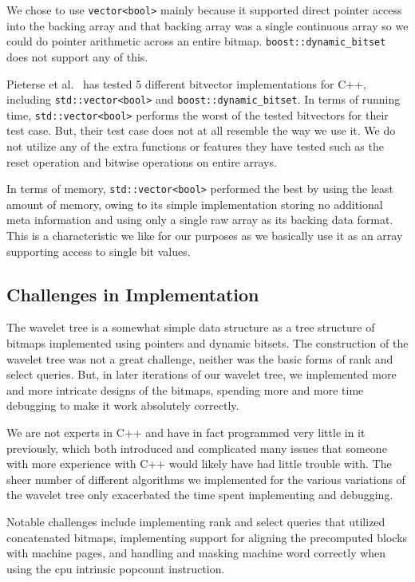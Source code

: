 We chose to use \texttt{vector<bool>} mainly because it supported direct pointer access into the backing array and that backing array was a single continuous array so we could do pointer arithmetic across an entire bitmap.
\texttt{boost::dynamic\_bitset} does not support any of this.

Pieterse et al.~ has tested 5 different bitvector implementations for C++, including \texttt{std::vector<bool>} and \texttt{boost::dynamic\_bitset}.
In terms of running time, \texttt{std::vector<bool>} performs the worst of the tested bitvectors for their test case.
But, their test case does not at all resemble the way we use it.
We do not utilize any of the extra functions or features they have tested such as the reset operation and bitwise operations on entire arrays.

In terms of memory, \texttt{std::vector<bool>} performed the best by using the least amount of memory, owing to its simple implementation storing no additional meta information and using only a single raw array as its backing data format.
This is a characteristic we like for our purposes as we basically use it as an array supporting access to single bit values.

\subsection{Challenges in Implementation}
The wavelet tree is a somewhat simple data structure as a tree structure of bitmaps implemented using pointers and dynamic bitsets.
The construction of the wavelet tree was not a great challenge, neither was the basic forms of rank and select queries.
But, in later iterations of our wavelet tree, we implemented more and more intricate designs of the bitmaps, spending more and more time debugging to make it work absolutely correctly.

We are not experts in C++ and have in fact programmed very little in it previously, which both introduced and complicated many issues that someone with more experience with C++ would likely have had little trouble with.
The sheer number of different algorithms we implemented for the various variations of the wavelet tree only exacerbated the time spent implementing and debugging.

Notable challenges include implementing rank and select queries that utilized concatenated bitmaps, implementing support for aligning the precomputed blocks with machine pages, and handling and masking machine word correctly when using the cpu intrinsic popcount instruction.


